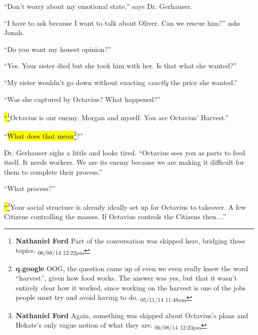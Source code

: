 ``Don't worry about my emotional state,'' says Dr. Gerhauser.

``I have to ask because I want to talk about Oliver.  Can we rescue him?'' asks Jonah.

``Do you want my honest opinion?''

``Yes. Your sister died but she took him with her.  Is that what she wanted?''

``My sister wouldn't go down without exacting \textit{exactly} the price she wanted.''

``Was she captured by Octavius?  What happened?''

\hl{``}\footnote{\textbf{Nathaniel Ford }Part of the conversation was skipped here, bridging these topics. \textsubscript{06/08/14 12:22pm}}Octavius is our enemy.  Morgan and myself.  You are Octavius' Harvest.''

``\hl{What does that mean}\footnote{\textbf{q.google }OOG, the question came up of even we even really knew the word ``harvest'', given how food works.  The answer was yes, but that it wasn't entirely clear how it worked, since working on the harvest is one of the jobs people most try and avoid having to do. \textsubscript{05/11/14 11:48am}}?''

Dr. Gerhauser sighs a little and looks tired.  ``Octavius sees you as parts to feed itself.  It needs workers.  We are its enemy because we are making it difficult for them to complete their process.''

``What process?''

\hl{``}\footnote{\textbf{Nathaniel Ford }Again, something was skipped about Octavius's plans and Hekate's only vague notion of what they are. \textsubscript{06/08/14 12:23pm}}Your social structure is already ideally set up for Octavius to takeover.  A few Citizens controlling the masses.  If Octavius controls the Citizens then....''

